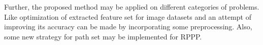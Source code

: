\documentclass{svproc}
\begin{document}
Further, the proposed method may be applied on different categories of problems. Like optimization of extracted feature set for image datasets and an attempt of improving its accuracy can be made  by incorporating some preprocessing. Also, some new strategy for path set may be implemented for RPPP.

%
%


\end{document}
